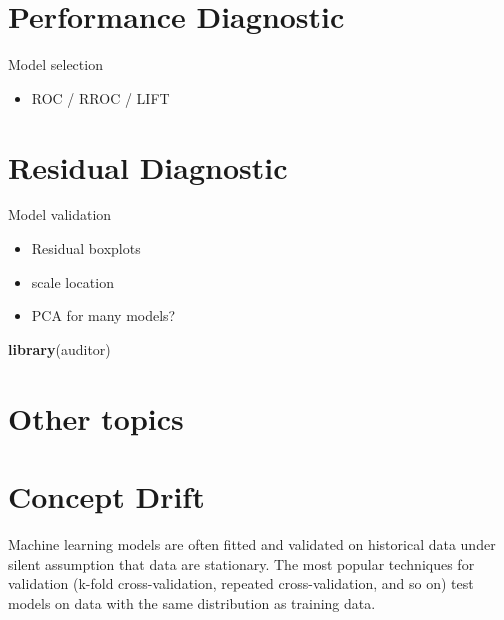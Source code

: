 \documentclass[]{krantz}
\newenvironment{Shaded}{\begin{snugshade}}{\end{snugshade}}
\newcommand{\KeywordTok}[1]{\textcolor[rgb]{0.13,0.29,0.53}{\textbf{#1}}}
\newcommand{\NormalTok}[1]{#1}
\providecommand{\tightlist}{%
  \setlength{\itemsep}{0pt}\setlength{\parskip}{0pt}}
\theoremstyle{definition}
\theoremstyle{definition}
\theoremstyle{definition}
\theoremstyle{remark}
\begin{document}
\hypertarget{modelComparisons}{%
\section{Performance Diagnostic}\label{modelComparisons}}

Model selection

\begin{itemize}
\tightlist
\item
  ROC / RROC / LIFT
\end{itemize}

\hypertarget{modelAuditing}{%
\section{Residual Diagnostic}\label{modelAuditing}}

Model validation

\begin{itemize}
\tightlist
\item
  Residual boxplots
\item
  scale location
\item
  PCA for many models?
\end{itemize}

\citep{R-auditor}

\begin{Shaded}
\begin{Highlighting}[]
\KeywordTok{library}\NormalTok{(auditor)}
\end{Highlighting}
\end{Shaded}

\hypertarget{other-topics}{%
\section{Other topics}\label{other-topics}}

\citep{R-randomForestExplainer} \citep{R-ICEbox} \citep{R-ALEPlot}

\citep{R-modelDown}

\hypertarget{concept-drift}{%
\section{Concept Drift}\label{concept-drift}}

Machine learning models are often fitted and validated on historical
data under silent assumption that data are stationary. The most popular
techniques for validation (k-fold cross-validation, repeated
cross-validation, and so on) test models on data with the same
distribution as training data.
\end{document}
